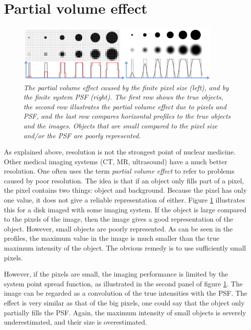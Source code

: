 \documentclass[11pt,oneside]{book}
\begin{document}
\section{Partial volume effect} \label{sec:pv}
\begin{figure}[tb]
\centering
\includegraphics[width=0.9\textwidth]{figs/fig_pv.pdf}
\caption{\label{fig:pv} \emph{The partial volume effect caused by the
finite pixel size (left), and by the finite system PSF (right). The
first row shows the true objects, the second row illustrates the
partial volume effect due to pixels and PSF, and the last row compares
horizontal profiles to the true objects and the images.  Objects that
are small compared to the pixel size and/or the PSF are poorly
represented.}}
\end{figure}
%
As explained above, resolution is not the strongest point of nuclear
medicine. Other medical imaging systems (CT, MR, ultrasound) have a
much better resolution. One often uses the term {\em partial volume
effect} to refer to problems caused by poor resolution. The idea is
that if an object only fills part of a pixel, the pixel contains two
things: object and background. Because the pixel has only one value,
it does not give a reliable representation of either. Figure
\ref{fig:pv} illustrates this for a disk imaged with some imaging
system. If the object is large compared to the pixels of the image,
then the image gives a good representation of the object. However,
small objects are poorly represented. As can be seen in the profiles,
the maximum value in the image is much smaller than the true maximum
intensity of the object. The obvious remedy is to use sufficiently
small pixels.

However, if the pixels are small, the imaging performance is limited
by the system point spread function, as illustrated in the second
panel of figure \ref{fig:pv}. The image can be regarded as a
convolution of the true intensities with the PSF. The effect is very
similar as that of the big pixels, one could say that the object only
partially fills the PSF. Again, the maximum intensity of small objects
is severely underestimated, and their size is overestimated.
\end{document}
